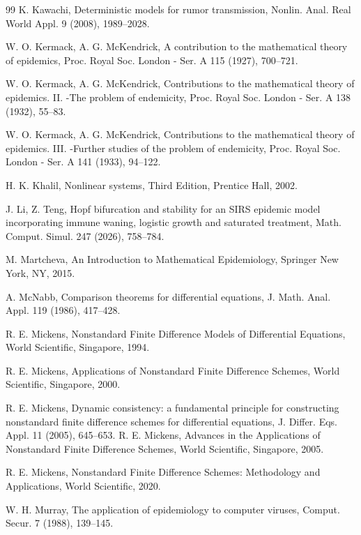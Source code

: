 \documentclass[11pt]{article}
\theoremstyle{definition}
\theoremstyle{remark}
\numberwithin{equation}{section}
\begin{document}
\begin{thebibliography}{99}
K. Kawachi, 
Deterministic models for rumor transmission, 
Nonlin. Anal. Real World Appl. 9 (2008), 1989--2028.

W. O. Kermack, A. G. McKendrick, 
A contribution to the mathematical theory of epidemics, 
Proc. Royal Soc. London - Ser. A 115 (1927), 700--721.

W. O. Kermack, A. G. McKendrick, 
Contributions to the mathematical theory of epidemics. II. -The problem of endemicity,
Proc. Royal Soc. London - Ser.  A 138 (1932), 55--83.

W. O. Kermack, A. G. McKendrick,
Contributions to the mathematical theory of epidemics. III. -Further studies of the problem of endemicity, 
Proc. Royal Soc. London - Ser. A 141 (1933), 94--122. 

H. K. Khalil,
Nonlinear systems, 
Third Edition, Prentice Hall, 2002.

J. Li, Z. Teng, 
Hopf bifurcation and stability for an SIRS epidemic model incorporating immune waning, logistic growth and saturated treatment, 
Math. Comput. Simul. 247 (2026), 758--784.

M. Martcheva, 
An Introduction to Mathematical Epidemiology,
Springer New York, NY, 2015.

A. McNabb, 
Comparison theorems for differential equations, 
J. Math. Anal. Appl. 119 (1986), 417--428.

R. E. Mickens,
Nonstandard Finite Difference Models of Differential Equations, 
World Scientific, Singapore, 1994.

R. E. Mickens,
Applications of Nonstandard Finite Difference Schemes,  
World Scientific, Singapore, 2000.

R. E. Mickens,
Dynamic consistency: a fundamental principle for constructing nonstandard finite difference schemes for differential equations,  
J. Differ. Eqs. Appl. 11 (2005), 645--653.
%
%
R. E. Mickens,  
Advances in the Applications of Nonstandard Finite Difference Schemes, 
World Scientific, Singapore, 2005.
%

R. E. Mickens, 
Nonstandard Finite Difference Schemes: Methodology and Applications, 
World Scientific, 2020.

W. H. Murray, 
The application of epidemiology to computer viruses,
Comput. Secur. 7 (1988), 139--145.



\end{thebibliography}
\end{document}
